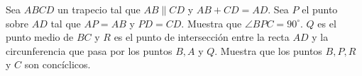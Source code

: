 Sea $ABCD$ un trapecio tal que $AB\parallel CD$ y $AB+CD=AD$. Sea $P$ el punto sobre $AD$ tal que $AP=AB$ y $PD=CD$. Muestra que $\angle BPC=90^{\circ}$. $Q$ es el punto medio de $BC$ y $R$ es el punto de intersección entre la recta $AD$ y la circunferencia que pasa por los puntos $B,A$ y $Q$. Muestra que los puntos $B,P,R$ y $C$ son concíclicos.

